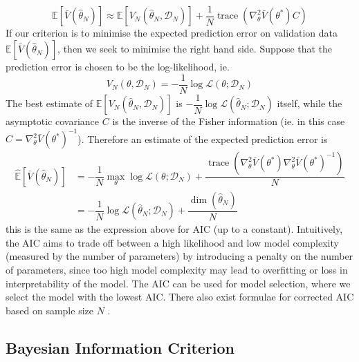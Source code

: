 \documentclass[11pt]{report} %
\begin{document}
\begin{equation}
\mathbb{E}\left[\bar{V}\left(\hat{\theta}_{N}\right)\right] \approx \mathbb{E}\left[V_{N}\left(\hat{\theta}_{N}, \mathcal{D}_{N}\right)\right] + \dfrac{1}{N}\operatorname{trace}\left(\nabla_{\theta}^{2}\bar{V}\left(\theta^{*}\right)C\right)
\end{equation}
If our criterion is to minimise the expected prediction error on validation data $\mathbb{E}\left[\bar{V}\left(\hat{\theta}_{N}\right)\right]$, then we seek to minimise the right hand side. Suppose that the prediction error is chosen to be the log-likelihood, ie.
\begin{equation}
V_{N}\left(\theta, \mathcal{D}_{N}\right)  = -\dfrac{1}{N}\log\mathcal{L}\left(\theta; \mathcal{D}_{N}\right)
\end{equation}
The best estimate of $\mathbb{E}\left[V_{N}\left(\hat{\theta}_{N}, \mathcal{D}_{N}\right)\right]$ is $-\dfrac{1}{N}\log\mathcal{L}\left(\hat{\theta}_{N}; \mathcal{D}_{N}\right)$ itself, while the asymptotic covariance $C$ is the inverse of the Fisher information (ie. in this case $C = \nabla_{\theta}^{2}\bar{V}\left(\theta^{*}\right)^{-1}$). Therefore an estimate of the expected prediction error is
\begin{align}
\widehat{\mathbb{E}}\left[\bar{V}\left(\hat{\theta}_{N}\right)\right] &= -\dfrac{1}{N}\max_{\theta}\log\mathcal{L}\left(\theta; \mathcal{D}_{N}\right) + \dfrac{\operatorname{trace}\left(\nabla_{\theta}^{2}\bar{V}\left(\theta^{*}\right)\nabla_{\theta}^{2}\bar{V}\left(\theta^{*}\right)^{-1}\right)}{N} \\
&= -\dfrac{1}{N}\log\mathcal{L}\left(\hat{\theta}_{N}; \mathcal{D}_{N}\right) + \dfrac{\dim\left(\hat{\theta}_{N}\right)}{N}
\end{align}
this is the same as the expression above for AIC (up to a constant). Intuitively, the AIC aims to trade off between a high likelihood and low model complexity (measured by the number of parameters) by introducing a penalty on the number of parameters, since too high model complexity may lead to overfitting or loss in interpretability of the model. The AIC can be used for model selection, where we select the model with the lowest AIC. There also exist formulae for corrected AIC based on sample size $N$ \cite{Claeskens2008}.

\subsection{Bayesian Information Criterion}
\end{document}
